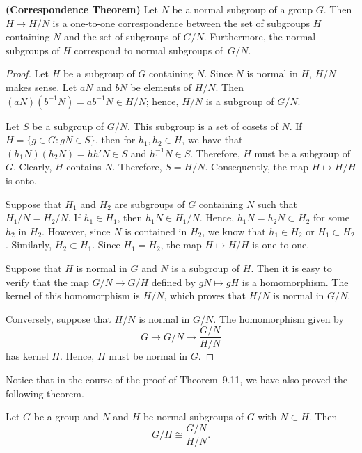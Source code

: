  
\begin{theorem} {\bf (Correspondence Theorem)}
Let $N$ be a normal subgroup of a group $G$. Then $H \mapsto H/N$
is a one-to-one correspondence between the set of subgroups $H$
containing $N$  and the set of subgroups of $G/N$. Furthermore, the
normal subgroups of $H$ correspond to normal subgroups of~$G/N$. 
\end{theorem}
 
 
\begin{proof}
Let $H$ be a subgroup of $G$ containing $N$. Since $N$ is normal in
$H$, $H/N$ makes sense.  Let $aN$ and $bN$ be elements of $H/N$. Then
$(aN)( b^{-1} N )= ab^{-1}N \in H/N$; hence, $H/N$ is a subgroup of
$G/N$. 


Let $S$ be a subgroup of $G/N$. This subgroup is a set of cosets of
$N$.  If  $H= \{ g \in G : gN \in S \}$, then for $h_1, h_2 \in H$, we
have that $(h_1 N)( h_2 N )= h h' N \in S$ and $h_1^{-1} N \in S$.
Therefore, $H$ must be a subgroup of $G$. Clearly, $H$ contains $N$.
Therefore, $S = H / N$. Consequently, the map  $H \mapsto H/H$ is
onto. 

 
Suppose that $H_1$ and $H_2$ are subgroups of $G$ containing $N$ such
that $H_1/N = H_2/N$. If $h_1 \in H_1$, then $h_1 N \in H_1/N$. Hence,
$h_1 N = h_2 N \subset H_2$ for some $h_2$ in $H_2$. However, since
$N$ is contained in $H_2$, we know that $h_1 \in H_2$ or $H_1 \subset
H_2$. Similarly, $H_2 \subset H_1$.  Since $H_1 = H_2$, the map  $H
\mapsto H/H$ is one-to-one. 

 
Suppose that $H$ is normal in $G$ and $N$ is a subgroup of $H$.  Then
it is easy to verify that the map $G/N \rightarrow G/H$ defined by $gN
\mapsto gH$ is  a homomorphism.  The kernel of this homomorphism is
$H/N$, which proves that $H/N$ is normal in $G/N$. 
 
 
Conversely, suppose that $H/N$ is normal in $G/N$. The homomorphism
given by 
$$
G \rightarrow G/N \rightarrow \frac{G/N}{H/N}
$$
has kernel $H$. Hence, $H$ must be normal in $G$.
\end{proof}
 
 
\vspace{ 2 ex }
 
 
Notice that in the course of the proof of Theorem~9.11, we have also
proved the following theorem. 
 
 
\begin{theorem}
Let $G$ be a group and $N$ and $H$ be normal subgroups of $G$ with $N
\subset H$.  Then 
$$
G/H \cong \frac{G/N}{H/N}.
$$
\end{theorem}
 
